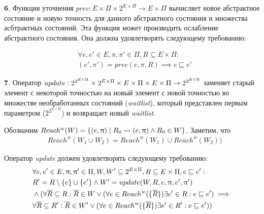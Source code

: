 {\textbf 6.} Функция уточнения $prec:E \times \Pi \times 2^{E \times \Pi} \rightarrow E \times \Pi$ вычисляет новое абстрактное состояние и новую точность для данного абстрактного состояния и множества асбтрактных состояний.
Эта функция может производить ослабление абстрактного состояния.
Она должна удовлетворять следующему требованию:

\begin{equation}
\label{prec_equation}
\begin{aligned}
& \forall e, e' \in E, \pi, \pi' \in \Pi, R \subseteq E \times \Pi:\\
& (e', \pi') = prec(e, \pi, R) \implies e \sqsubseteq e'
\end{aligned}
\end{equation}


{\textbf 7.} Оператор
$update: 2^{2^{E\times \Pi}} \times 2^{E\times \Pi} \times E \times \Pi \times E \times \Pi \rightarrow 2^{2^{E \times \Pi}}$
заменяет старый элемент с некоторой точностью на новый элемент с новой точностью во множестве необработанных состояний (\emph{waitlist}), который представлен первым параметром ($2^{2^{E\times \Pi}}$) и возвращает новый \emph{waitlist}.

Обозначим $Reach^w(W) = \{(e, \uppi) \mid R_0 \leadsto (e,\uppi) \land R_0 \in W\}$.
Заметим, что 
\begin{equation}
\label{reach_w_equation}
\begin{aligned}
& Reach^w(W_1 \cup W_2) = Reach^w(W_1) \cup Reach^w(W_2))
\end{aligned}
\end{equation}

Оператор \emph{update} должен удовлетворять следующему требованию:
\begin{equation}
\label{cpa_update_transfer_eq}
\begin{aligned}
& \forall e, e' \in E, \uppi, \uppi' \in \Pi, W,W' \subseteq 2^{E\times \Pi},  R \subseteq E\times \Pi, e \sqsubseteq e':\\
& R' = R \setminus \{e\} \cup \{e'\} \land W' = update(W, R, e, \uppi, e',\uppi') \\
& \land ( \forall \overline{R} \subseteq R: \overline{R} \in W \lor (\forall e \in Reach^w(\{\overline{R}\}) \exists e' \in R: e \sqsubseteq e') \implies  \\
& \forall \overline{R} \subseteq R': \overline{R} \in W' \lor (\forall e \in Reach^w(\{\overline{R}\}) \exists e' \in R': e \sqsubseteq e'))
\end{aligned}
\end{equation}

